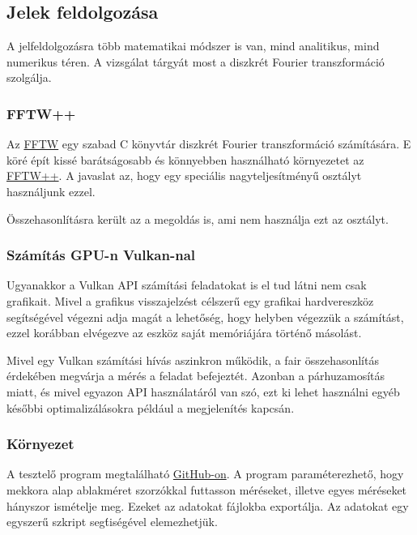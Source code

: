 
\subsection{Jelek feldolgoz\'asa}

A jelfeldolgoz\'asra t\"obb matematikai m\'odszer is van, mind analitikus, mind numerikus t\'eren.
A vizsg\'alat t\'argy\'at most a diszkr\'et Fourier transzform\'aci\'o szolg\'alja.

\subsubsection{FFTW++}
Az \href{http://www.fftw.org/}{FFTW} egy szabad C k\"onyvt\'ar diszkr\'et Fourier transzform\'aci\'o sz\'am\'it\'as\'ara.
E k\"or\'e \'ep\'it kiss\'e bar\'ats\'agosabb \'es k\"onnyebben haszn\'alhat\'o k\"ornyezetet az \href{http://fftwpp.sourceforge.net/}{FFTW++}.
A javaslat az, hogy egy speci\'alis nagyteljes\'itm\'eny\H u  oszt\'alyt haszn\'aljunk ezzel.

\"Osszehasonl\'it\'asra ker\"ult az a megold\'as is, ami nem haszn\'alja ezt az oszt\'alyt.

\subsubsection{Sz\'am\'it\'as GPU-n Vulkan-nal}
Ugyanakkor a Vulkan API sz\'am\'it\'asi feladatokat is el tud l\'atni nem csak grafikait. 
Mivel a grafikus visszajelz\'est c\'elszer\H u egy grafikai hardvereszk\"oz seg\'its\'eg\'evel v\'egezni adja mag\'at a lehet\H os\'eg, hogy helyben v\'egezz\"uk a sz\'am\'it\'ast, ezzel kor\'abban elv\'egezve az eszk\"oz saj\'at mem\'ori\'aj\'ara t\"ort\'en\H o m\'asol\'ast.

Mivel egy Vulkan sz\'am\'it\'asi h\'iv\'as aszinkron m\H uk\"odik, a fair \"osszehasonl\'it\'as \'erdek\'eben megv\'arja a m\'er\'es a feladat befejezt\'et. Azonban a p\'arhuzamos\'it\'as miatt, \'es mivel egyazon API haszn\'alat\'ar\'ol van sz\'o, ezt ki lehet haszn\'alni egy\'eb k\'es\H obbi optimaliz\'al\'asokra p\'eld\'aul a megjelen\'it\'es kapcs\'an.

\subsubsection{K\"ornyezet}
A tesztel\H o program megtal\'alhat\'o \href{https://github.com/petii/efop-signalproc}{GitHub-on}. 
A program param\'eterezhet\H o, hogy mekkora alap ablakm\'eret szorz\'okkal futtasson m\'er\'eseket, illetve egyes m\'er\'eseket h\'anyszor ism\'etelje meg. 
Ezeket az adatokat  f\'ajlokba export\'alja. Az adatokat egy egyszer\H u  szkript seg\'tis\'eg\'evel elemezhetj\"uk.

